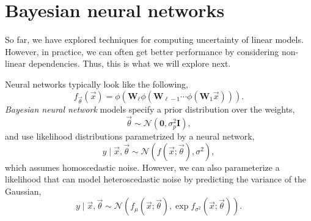 \section{Bayesian neural networks}

So far, we have explored techniques for computing uncertainty of linear
models. However, in practice, we can often get better performance by
considering non-linear dependencies. Thus, this is what we will explore next.

Neural networks typically look like the following, \[
    f_{\vec{\theta}}(\vec{x}) = \phi(\bm{W}_\ell \phi(\bm{W}_{\ell-1} \cdots \phi(\bm{W}_1\vec{x}))).
\]
\textit{Bayesian neural network} models specify a prior distribution over the
weights, \[
    \vec{\theta} \sim \mathcal{N}(\bm{0}, \sigma_p^2\bm{I}),
\]
and use likelihood distributions parametrized by a neural network, \[
    y\mid \vec{x},\vec{\theta} \sim \mathcal{N}(f(\vec{x};\vec{\theta}), \sigma^2),
\]
which assumes homoscedastic noise.
However, we can also parameterize a likelihood that can model heteroscedastic
noise by predicting the variance of the Gaussian, \[
    y\mid \vec{x},\vec{\theta} \sim \mathcal{N}(f_{\mu}(\vec{x};\vec{\theta}), \exp f_{\sigma^2}(\vec{x};\vec{\theta})).
\]

